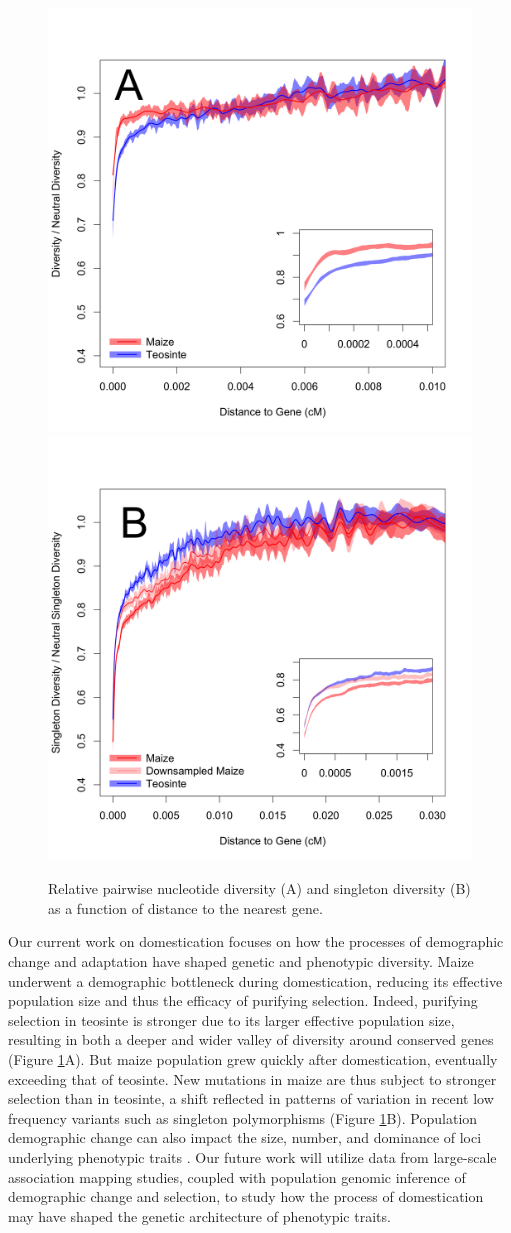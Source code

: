 \documentclass[11pt,letterpaper]{article}
\begin{document}
\begin{figure}[t]
\centering
\includegraphics[width=.45\textwidth]{figs/distanceToGene_WithSignificance_Folded2_manuscript.png} \includegraphics[width=.45\textwidth]{figs/distanceToGene_WithSignificance_Singletons_Downsampled_threeLines_manuscript.png}
\caption{Relative pairwise nucleotide diversity (A) and singleton diversity (B) as a function of distance to the nearest gene.  
\label{fig:purify}}
\end{figure}

Our current work on domestication focuses on how the processes of demographic change and adaptation have shaped genetic and phenotypic diversity.
Maize underwent a demographic bottleneck during domestication, reducing its effective population size and thus the efficacy of purifying selection.
Indeed, purifying selection in teosinte is stronger due to its larger effective population size, resulting in both a deeper and wider valley of diversity around conserved genes (Figure \ref{fig:purify}A).
But maize population grew quickly after domestication, eventually exceeding that of teosinte.
New mutations in maize are thus subject to stronger selection than in teosinte, a shift reflected in patterns of variation in recent low frequency variants such as singleton polymorphisms (Figure \ref{fig:purify}B).   
Population demographic change can also impact the size, number, and dominance of loci underlying phenotypic traits \citep{lohmueller2014impact,gazave2013population}.
Our future work will utilize data from large-scale association mapping studies, coupled with population genomic inference of demographic change and selection, to study how the process of domestication may have shaped the genetic architecture of phenotypic traits.
\end{document}
